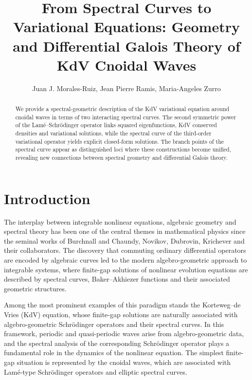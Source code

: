 \documentclass[a4paper,12pt]{article}
\title{From Spectral Curves to Variational Equations: Geometry and Differential Galois Theory of KdV Cnoidal Waves}
\author{Juan J. Morales-Ruiz, Jean Pierre Ramis, Maria-Angeles Zurro}
\date{}
\begin{document}
\maketitle
\begin{abstract}
   We provide a spectral-geometric description of the KdV variational equation around cnoidal waves in terms of two interacting spectral curves. The second symmetric power of the Lamé–Schr\"odinger operator links squared eigenfunctions, KdV conserved densities and variational solutions, while the spectral curve of the third-order variational operator yields explicit closed-form solutions. The branch points of the spectral curve appear as distinguished loci where these constructions become unified, revealing new connections between spectral geometry and differential Galois theory.
\end{abstract}
\tableofcontents






\section{Introduction}\label{sec-intro}



The interplay between integrable nonlinear equations, algebraic geometry and spectral theory has been one of the central themes in mathematical physics since the seminal works of Burchnall and Chaundy, Novikov, Dubrovin, Krichever and their collaborators. The discovery that commuting ordinary differential operators are encoded by algebraic curves led to the modern algebro-geometric approach to integrable systems, where finite-gap solutions of nonlinear evolution equations are described by spectral curves, Baker–Akhiezer functions and their associated geometric structures.

Among the most prominent examples of this paradigm stands the Korteweg–de Vries (KdV) equation, whose finite-gap solutions are naturally associated with algebro-geometric Schrödinger operators and their spectral curves. In this framework, periodic and quasi-periodic waves arise from algebro-geometric data, and the spectral analysis of the corresponding Schrödinger operator plays a fundamental role in the dynamics of the nonlinear equation. The simplest finite-gap situation is represented by the cnoidal waves, which are associated with Lamé-type Schrödinger operators and elliptic spectral curves.
\end{document}
